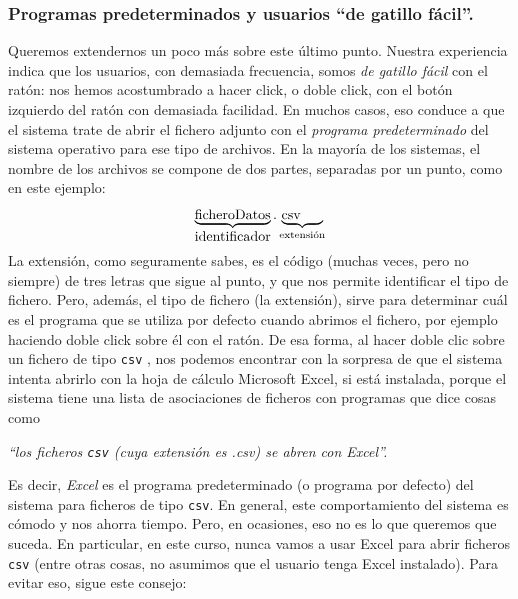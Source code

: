 \documentclass[10pt,a4paper]{article}\usepackage[]{graphicx}\usepackage[]{color}
\newcounter {cont01}
\begin{document}
\subsubsection{Programas predeterminados y usuarios ``de gatillo fácil''.}

Queremos extendernos un poco más sobre este último punto. Nuestra experiencia indica que los
usuarios, con demasiada frecuencia, somos {\em de gatillo fácil} con el ratón: nos hemos
acostumbrado a hacer click, o doble click, con el botón izquierdo del ratón con demasiada
facilidad. En muchos casos, eso conduce a que el sistema trate de abrir el fichero adjunto  con el
{\em programa predeterminado} del sistema operativo para ese tipo de archivos. En la mayoría de los
sistemas, el nombre de los archivos se compone de dos partes, separadas por un punto, como en este
ejemplo:
\[
\underbrace{\mbox{ficheroDatos}}_{\mbox{identificador}}.\underbrace{\mbox{csv}\phantom{aaa}}_{\mbox{\scriptsize extensión}}
\]
La {\sf extensión}, como seguramente sabes, es el código (muchas veces, pero no siempre) de tres
letras que sigue al punto, y que nos permite identificar el tipo de fichero. Pero, además, el tipo
de fichero (la extensión), sirve para determinar cuál es el programa que se utiliza por defecto cuando abrimos el fichero, por ejemplo haciendo doble click sobre él con el ratón. De esa forma, al hacer doble clic sobre un fichero de tipo {\tt csv} , nos podemos encontrar con la sorpresa de que el sistema intenta abrirlo con la hoja de cálculo Microsoft Excel, si está instalada, porque el sistema tiene
una lista de asociaciones de ficheros con programas que dice cosas como
\begin{center}
{\em ``los ficheros {\tt csv}  (cuya extensión es {.csv}) se abren con Excel''.}
\end{center}
Es decir, {\em Excel} es el {\sf programa predeterminado} (o programa por defecto) del sistema para
ficheros de tipo {\tt csv}. En general, este comportamiento del sistema es cómodo y nos ahorra
tiempo. Pero, en ocasiones, eso no es lo que queremos que suceda. En particular, en este curso,
nunca vamos a usar Excel para abrir ficheros {\tt csv}  (entre otras cosas, no asumimos que el
usuario tenga Excel instalado). Para evitar eso, sigue este consejo:
        \begin{center}
        \end{center}
\end{document}
